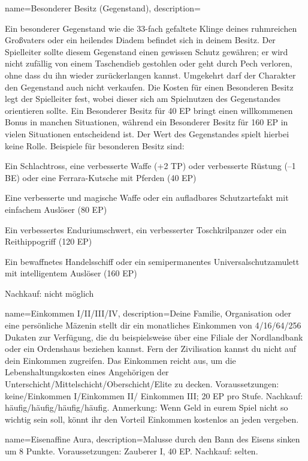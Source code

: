 {
    name={Besonderer Besitz (Gegenstand)},
    description={Ein besonderer Gegenstand wie die 33-fach gefaltete Klinge deines ruhmreichen Großvaters oder ein heilendes Diadem befindet sich in deinem Besitz. Der Spielleiter sollte diesem Gegenstand einen gewissen Schutz gewähren; er wird nicht zufällig von einem Taschendieb gestohlen oder geht durch Pech verloren, ohne dass du ihn wieder zurückerlangen kannst. Umgekehrt darf der Charakter den Gegenstand auch nicht verkaufen. Die Kosten für einen Besonderen Besitz legt der Spielleiter fest, wobei dieser sich am Spielnutzen des Gegenstandes orientieren sollte. Ein Besonderer Besitz für 40 EP bringt einen willkommenen Bonus in manchen Situationen, während ein Besonderer Besitz für 160 EP in vielen Situationen entscheidend ist. Der Wert des Gegenstandes spielt hierbei keine Rolle. Beispiele für besonderen Besitz sind:
\begin{description}
\item Ein Schlachtross, eine verbesserte Waffe (+2 TP) oder verbesserte Rüstung (–1 BE) oder eine Ferrara-Kutsche mit Pferden (40 EP)
\item Eine verbesserte und magische Waffe oder ein aufladbares Schutzartefakt mit einfachem Auslöser (80 EP)
\item Ein verbessertes Enduriumschwert, ein verbesserter Toschkrilpanzer oder ein Reithippogriff (120 EP)
\item Ein bewaffnetes Handelsschiff oder ein semipermanentes Universalschutzamulett mit intelligentem Auslöser (160 EP)
\end{description}
Nachkauf: nicht möglich}}

{
    name={Einkommen I/II/III/IV},
    description={Deine Familie, Organisation oder eine persönliche Mäzenin stellt dir ein monatliches Einkommen von 4/16/64/256 Dukaten zur Verfügung, die du beispielsweise über eine Filiale der Nordlandbank oder ein Ordenshaus beziehen kannst. Fern der Zivilisation kannst du nicht auf dein Einkommen zugreifen. Das Einkommen reicht aus, um die Lebenshaltungskosten eines Angehörigen der Unterschicht/Mittelschicht/Oberschicht/Elite zu decken. Voraussetzungen: keine/Einkommen I/Einkommen II/ Einkommen III; 20 EP pro Stufe. Nachkauf: häufig/häufig/häufig/häufig. Anmerkung: Wenn Geld in eurem Spiel nicht so wichtig sein soll, könnt ihr den Vorteil Einkommen kostenlos an jeden vergeben.}}

{
    name={Eisenaffine Aura},
    description={Malusse durch den Bann des Eisens sinken um 8 Punkte. Voraussetzungen: Zauberer I, 40 EP. Nachkauf: selten.}}

